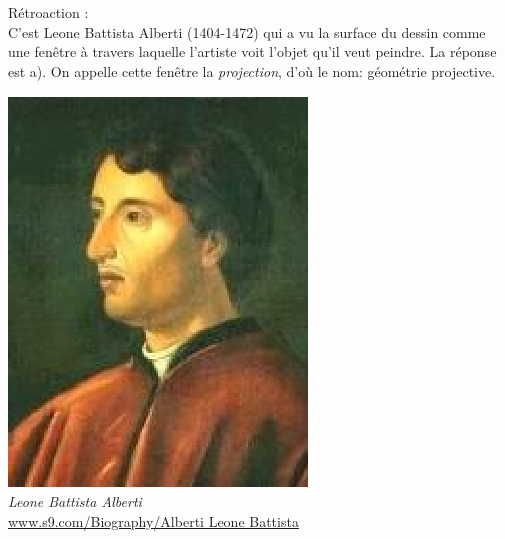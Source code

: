 \documentclass[letterpaper, 12pt]{article}
\begin{document}
R\'etroaction :\\
C'est Leone Battista Alberti (1404-1472) qui a vu la surface du dessin comme une fen\^etre \`a travers laquelle l'artiste voit l'objet qu'il veut peindre. La r\'eponse est a). On appelle cette fen\^etre la \emph{projection}, d'o\`u le nom: g\'eom\'etrie projective.
\begin{center}
\includegraphics[scale=0.5]{Battista.eps}\\
\emph{{\small Leone Battista Alberti}}\\
\href{http://www.s9.com/Biography/Alberti-Leone-Battista}{www.s9.com/Biography/Alberti Leone Battista}\\[5mm]
\end{center}
\end{document}
